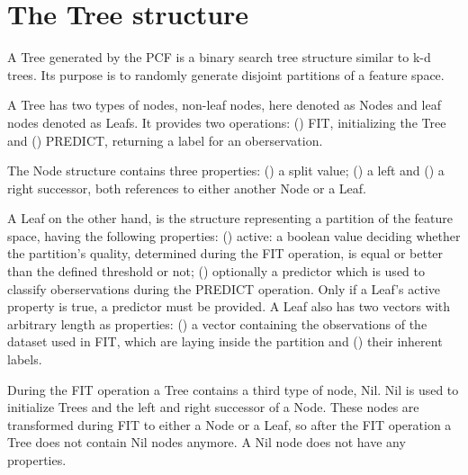 \section{The Tree structure}
\label{sec:tree}

A Tree generated by the PCF is a binary search tree
structure similar to k-d trees. Its purpose is to randomly
generate disjoint partitions of a feature space.

A Tree has two types of nodes, non-leaf nodes, here denoted
as Nodes and leaf nodes denoted as Leafs. It provides two
operations: () FIT, initializing the Tree
and () PREDICT, returning a label for an
oberservation.

The Node structure contains three properties:
() a split value; () a left
and () a right successor, both references to
either another Node or a Leaf.

A Leaf on the other hand, is the structure
representing a partition of the feature space, having the
following properties: () active: a boolean
value deciding whether the partition's quality, determined
during the FIT operation, is equal or better than the
defined threshold or not; () optionally a
predictor which is used to classify oberservations during
the PREDICT operation. Only if a Leaf's active property is
true, a predictor must be provided. A Leaf also has two
vectors with arbitrary length as properties:
() a vector containing the observations of
the dataset used in FIT, which are laying inside the
partition and () their inherent labels.

During the FIT operation a Tree contains a third type of
node, Nil. Nil is used to initialize Trees
and the left and right successor of a Node. These nodes are
transformed during FIT to either a Node or a Leaf, so after
the FIT operation a Tree does not contain Nil nodes
anymore. A Nil node does not have any properties.




